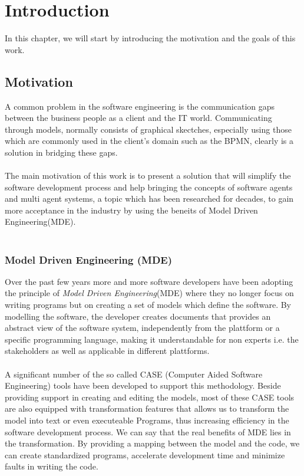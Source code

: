 \chapter{Introduction}
In this chapter, we will start by introducing the motivation and the goals of this work. 
\section{Motivation}
A common problem in the software engineering is the communication gaps between the business people as a client and the IT world.  Communicating through models, normally consists of graphical skectches, especially using those which are commonly used in the client's domain such as the BPMN, clearly is a solution in bridging these gaps. \\\\
The main motivation of this work is to present a solution that will simplify the software development process and help bringing the concepts of software agents and multi agent systems, a topic which has been researched for decades, to gain more acceptance in the industry by using the beneits of Model Driven Engineering(MDE). \\\\
\label{sec:Motivation}
\subsection{Model Driven Engineering (MDE)}
Over the past few years more and more software developers have been adopting the principle of \textit{Model Driven Engineering}(MDE) where 
they no longer focus on writing programs but on creating a set of models which define the software. By modelling the software, the developer creates documents that provides an abstract view of the software system, independently from the plattform or a specific programming language, making it understandable for non experts i.e. the stakeholders as well as applicable in different plattforms. 
\\\\
A significant number of the so called  CASE (Computer Aided Software Engineering) tools have been developed to support this methodology. Beside providing support in creating and editing the models, most of these CASE tools are also equipped with transformation features that allows us to transform the model into text or even executeable Programs, thus increasing efficiency in the software development process. We can say that the real benefits of MDE lies in the transformation. By providing a mapping between the model and the code, we can create standardized programs, accelerate development time and minimize faults in writing the code. \\\\

